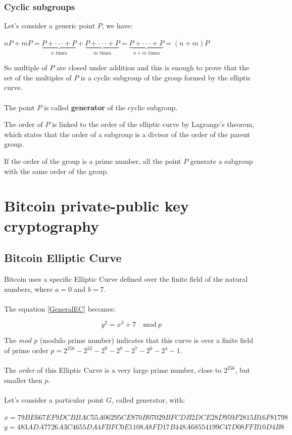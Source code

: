 \subsubsection{Cyclic subgroups}
Let's consider a generic point $P$, we have:
\begin{center} 
	$ nP+mP=\underbrace{
		P+\cdot \cdot \cdot+P
	}_{n\text{ times}}+
		\underbrace{
		P+\cdot \cdot \cdot+P
	}_{m\text{ times}}=
	\underbrace{
		P+\cdot \cdot \cdot+P
	}_{n+m\text{ times}} = 
	(n+m)P$
\end{center}
So multiple of $P$ are closed under addition and this is enough to prove that the set of the multiples of $P$ is a cyclic subgroup of the group formed by the elliptic curve.
\\ \\
The point $P$ is called \textbf{generator} of the cyclic subgroup.

\begin{remark}
	The order of $P$ is linked to the order of the elliptic curve by Lagrange's theorem, which states that the order of a subgroup is a divisor of the order of the parent group.
\end{remark}

\begin{remark}
	If the order of the group is a prime number, all the point $P$ generate a subgroup with the same order of the group.
\end{remark}



\section{Bitcoin private-public key cryptography}

\subsection{Bitcoin Elliptic Curve}
Bitcoin uses a specific Elliptic Curve defined over the finite field of the natural numbers, where $a=0$ and $b=7$. \\ \\
The equation \ref{GeneralEC} becomes:

\begin{equation}\label{BitcoinEC}
y^2=x^3+7 \quad \textrm{mod} \ p
\end{equation}

The \textit{mod p} (modulo prime number) indicates that this curve is over a finite field of prime order $p=2^{256}-2^{32}-2^9-2^8-2^7-2^6-2^4-1$.
\\ \\
The \textit{order} of this Elliptic Curve is a very large prime number, close to $2^{256}$, but smaller then $p$. \\ \\
Let's consider a particular point $G$, called generator, with:
\begin{center} 
	$ x=79BE667E F9DCBBAC 55A06295 CE870B07 029BFCDB 2DCE28D9 59F2815B 16F81798$\\
	$y=483ADA77 26A3C465 5DA4FBFC 0E1108A8 FD17B448 A6855419 9C47D08F FB10D4B8$
\end{center}

